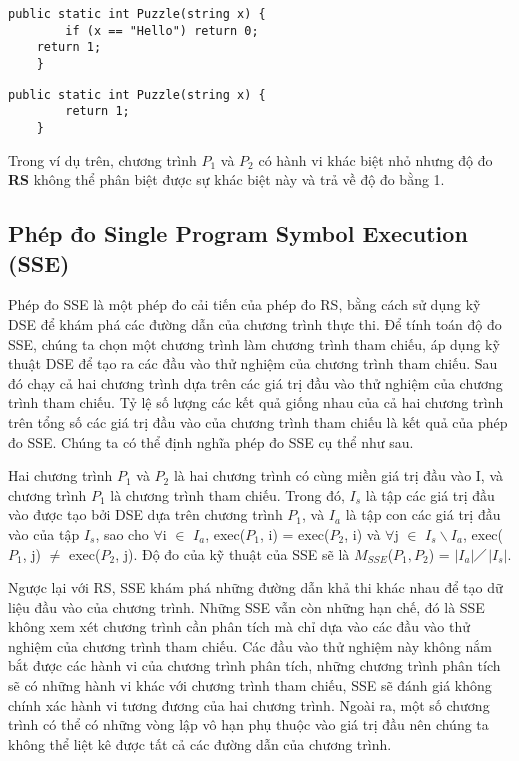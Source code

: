 \begin{lstlisting}[caption={Chương trình $P_{1}$}, label={Script}]
	public static int Puzzle(string x) {
		if (x == "Hello") return 0;		
	return 1;
	}
\end{lstlisting}

	
\begin{lstlisting}[caption={Chương trình $P_{2}$}, label={Script}]
	public static int Puzzle(string x) {
		return 1;
	}
\end{lstlisting}
	
Trong ví dụ trên, chương trình $P_{1}$ và $P_{2}$ có hành vi khác biệt
nhỏ nhưng độ đo \textbf{RS} không thể phân biệt được sự khác biệt này
và trả về độ đo bằng 1.
	
\subsection{Phép đo Single Program Symbol Execution (SSE)}
Phép đo SSE là một phép đo cải tiến của phép đo RS, bằng cách sử dụng kỹ DSE để khám phá các đường dẫn của chương trình thực thi. Để tính toán độ đo SSE, chúng ta chọn một chương trình làm chương trình tham chiếu, áp dụng kỹ thuật DSE để tạo ra các đầu vào thử nghiệm của chương trình tham chiếu. Sau đó chạy cả hai chương trình dựa trên các giá trị đầu vào thử nghiệm của chương trình tham chiếu. Tỷ lệ số lượng các kết quả giống nhau của cả hai chương trình trên tổng số các giá trị đầu vào của chương trình tham chiếu là kết quả của phép đo SSE. Chúng ta có thể định nghĩa phép đo SSE cụ thể như sau.

\begin{definition}
  Hai chương trình $P_{1}$ và $P_{2}$ là hai chương trình có cùng miền
  giá trị đầu vào I, và chương trình $P_{1}$ là chương trình tham chiếu. Trong đó,
  $I_{s}$ là tập các giá trị đầu vào được tạo bởi DSE dựa trên chương trình $P_{1}$, và
  $I_{a}$ là tập con các giá trị đầu vào của tập $I_{s}$, sao cho
  $\forall$i $\in$ $I_{a}$, exec($P_{1}$, i) = exec($P_{2}$, i) và
  $\forall$j $\in$ $I_{s} \backslash I_{a}$, exec($P_{1}$, j) $\neq$
  exec($P_{2}$, j). Độ đo của kỹ thuật của SSE sẽ là
  $M_{SSE}$($P_{1},P_{2}$) =
  $\left|I_{a}\right|$$\diagup$$\left|I_{s}\right|$.
\end{definition}

Ngược lại với RS, SSE khám phá những đường dẫn khả thi khác nhau để tạo dữ liệu đầu vào của chương trình. Những SSE vẫn còn những hạn chế, đó là SSE không xem xét chương trình cần phân tích mà chỉ dựa vào các đầu vào thử nghiệm của chương trình tham chiếu. Các đầu vào thử nghiệm này không nắm bắt được các hành vi của chương trình phân tích, những chương trình phân tích sẽ có những hành vi khác với chương trình tham chiếu, SSE sẽ đánh giá không chính xác hành vi tương đương của hai chương trình. Ngoài ra, một số chương trình có thể có những vòng lập vô hạn phụ thuộc vào giá trị đầu nên chúng ta không thể liệt kê được tất cả các đường dẫn của chương trình.

